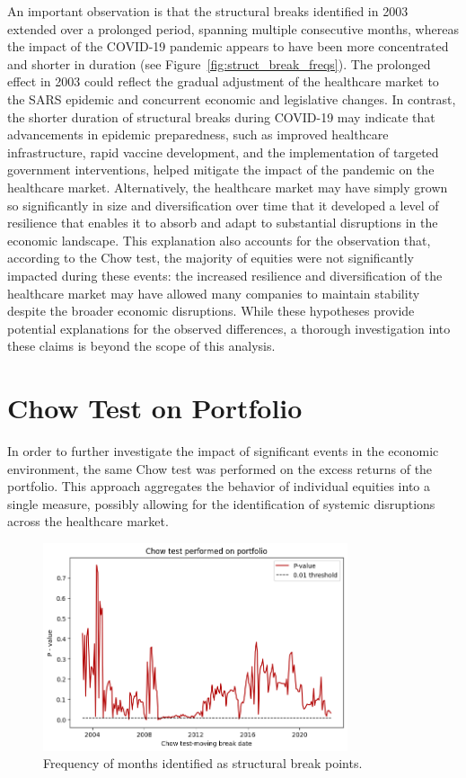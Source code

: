 An important observation is that the structural breaks identified in 2003 extended over a prolonged period, spanning multiple
consecutive months, whereas the impact of the COVID-19 pandemic appears to have been more concentrated and shorter in duration
(see Figure~\ref{fig:struct_break_freqs}).
The prolonged effect in 2003 could reflect the gradual adjustment of the healthcare market to the SARS epidemic and concurrent
economic and legislative changes.
In contrast, the shorter duration of structural breaks during COVID-19 may indicate that advancements in epidemic preparedness,
such as improved healthcare infrastructure, rapid vaccine development, and the implementation of targeted government 
interventions, helped mitigate the impact of the pandemic on the healthcare market. 
Alternatively, the healthcare market may have simply grown so significantly in size and diversification over time that it 
developed a level of resilience that enables it to absorb and adapt to substantial disruptions in the economic landscape.
This explanation also accounts for the observation that, according to the Chow test, the majority of equities were not
significantly impacted during these events: the increased resilience and diversification of the healthcare market may have
allowed many companies to maintain stability despite the broader economic disruptions.
While these hypotheses provide potential explanations for the observed differences, a thorough investigation into these claims
is beyond the scope of this analysis.


\section{Chow Test on Portfolio}

In order to further investigate the impact of significant events in the economic environment, the same Chow test was 
performed on the excess returns of the portfolio. 
This approach aggregates the behavior of individual equities into a single measure, possibly allowing for the identification 
of systemic disruptions across the healthcare market.

\begin{figure}[h!]
    \centering
    \includegraphics[width=0.8\textwidth]{images/portchowlio.png}
    \caption{Frequency of months identified as structural break points.}\label{fig:portchowlio}
\end{figure}

